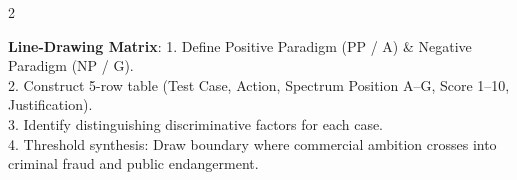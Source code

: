 \documentclass[9pt,a4paper]{extarticle}
\begin{document}
\begin{multicols}{2}
\begin{tcolorbox}[compact,colframe=primary,title={Scaffold 4: 15 Mark Questions (15 Min)}]
\textbf{Line-Drawing Matrix}:
1. Define Positive Paradigm (PP / A) \& Negative Paradigm (NP / G).\\
2. Construct 5-row table (Test Case, Action, Spectrum Position A--G, Score 1--10, Justification).\\
3. Identify distinguishing discriminative factors for each case.\\
4. Threshold synthesis: Draw boundary where commercial ambition crosses into criminal fraud and public endangerment.
\end{tcolorbox}

\end{multicols}
\end{document}

